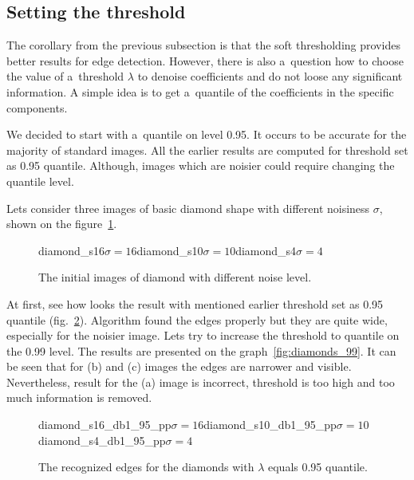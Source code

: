 
\subsection{Setting the threshold}
The corollary from the previous subsection is that the soft thresholding provides better results for edge detection. However, there is also a~question how to choose the value of a~threshold $\lambda$ to denoise coefficients and do not loose any significant information. A simple idea is to get a~quantile of the coefficients in the specific components.

We decided to start with a~quantile on level 0.95. It occurs to be accurate for the majority of standard images. All the earlier results are computed for threshold set as 0.95 quantile. Although, images which are noisier could require changing the quantile level.

Lets consider three images of basic diamond shape with different noisiness $\sigma$, shown on the figure~\ref{fig:diamonds}.

\begin{figure}[h]
	\begin{subdiagrams3}{diamond_s16}{$\sigma=16$}{diamond_s10}{$\sigma=10$}{diamond_s4}{$\sigma=4$}
	\end{subdiagrams3}
	\centering
	\caption{The initial images of diamond with different noise level.}
	\label{fig:diamonds}
\end{figure}

At first, see how looks the result with mentioned earlier threshold set as 0.95 quantile (fig.~\ref{fig:diamonds_95}). Algorithm found the edges properly but they are quite wide, especially for the noisier image. Lets try to increase the threshold to quantile on the 0.99 level. The results are presented on the graph~\ref{fig:diamonds_99}. It can be seen that for (b) and (c) images the edges are narrower and visible. Nevertheless, result for the (a) image is incorrect, threshold is too high and too much information is removed.

\begin{figure}[h]
	\begin{subdiagrams3}{diamond_s16_db1_95_pp}{$\sigma=16$}{diamond_s10_db1_95_pp}{$\sigma=10$}{diamond_s4_db1_95_pp}{$\sigma=4$}
	\end{subdiagrams3}
	\centering
	\caption{The recognized edges for the diamonds with $\lambda$ equals 0.95 quantile.}
	\label{fig:diamonds_95}
\end{figure}

